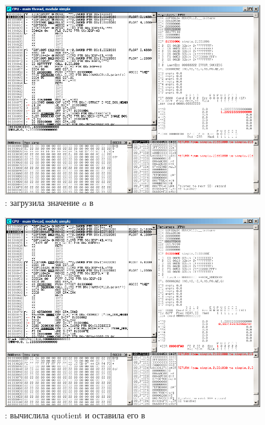 \begin{figure}[H]
\centering
\includegraphics[scale=\FigScale]{patterns/205_floating_SIMD/simple_olly1.png}
\caption{\olly:  загрузила значение $a$ в }
\label{fig:FPU_SIMD_simple_olly1}
\end{figure}

\clearpage
\begin{figure}[H]
\centering
\includegraphics[scale=\FigScale]{patterns/205_floating_SIMD/simple_olly2.png}
\caption{\olly:  вычислила \gls{quotient} 
и оставила его в }
\label{fig:FPU_SIMD_simple_olly2}
\end{figure}

